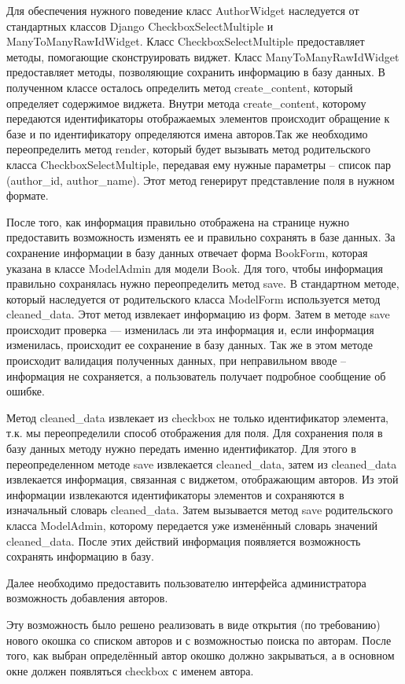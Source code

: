 \documentclass[a4paper]{report}
\begin{document}
Для обеспечения нужного поведение класс AuthorWidget наследуется от стандартных классов Django CheckboxSelectMultiple и ManyToManyRawIdWidget. Класс CheckboxSelectMultiple предоставляет методы, помогающие сконструировать виджет. Класс ManyToManyRawIdWidget предоставляет методы, позволяющие сохранить информацию в базу данных. В полученном классе осталось определить метод create\_content, который определяет содержимое виджета. Внутри метода create\_content, которому передаются идентификаторы отображаемых элементов происходит обращение к базе и по идентификатору определяются имена авторов.Так же необходимо переопределить метод render, который будет вызывать метод родительского класса CheckboxSelectMultiple, передавая ему нужные параметры -- список пар (author\_id, author\_name). Этот метод генерирут представление поля в нужном формате.

После того, как информация правильно отображена на странице нужно предоставить возможность изменять ее и правильно сохранять в базе данных. За сохранение  информации в базу данных отвечает форма BookForm, которая указана в классе ModelAdmin для модели Book. Для того, чтобы информация правильно сохранялась нужно переопределить метод save. В стандартном методе, который наследуется от родительского класса ModelForm используется метод cleaned\_data. Этот метод извлекает информацию из форм. Затем в методе save происходит проверка --- изменилась ли эта информация и, если информация изменилась, происходит ее сохранение в базу данных. Так же в этом методе происходит валидация полученных данных, при неправильном вводе -- информация не сохраняется, а пользователь получает подробное сообщение об ошибке. 

Метод cleaned\_data извлекает из checkbox не только идентификатор элемента, т.к. мы переопределили способ отображения для поля. Для сохранения поля в базу данных методу нужно передать именно идентификатор. Для этого в переопределенном методе save извлекается cleaned\_data, затем из cleaned\_data извлекается информация, связанная с виджетом, отображающим авторов. Из этой информации извлекаются идентификаторы элементов и сохраняются в изначальный словарь cleaned\_data. Затем вызывается метод save родительского класса ModelAdmin, которому передается уже изменённый словарь значений cleaned\_data. После этих действий информация появляется возможность сохранять информацию в базу.

Далее необходимо предоставить пользователю интерфейса администратора возможность добавления авторов. 

Эту возможность было решено реализовать в виде открытия (по требованию) нового окошка со списком авторов и с возможностью поиска по авторам. После того, как выбран определённый автор окошко должно закрываться, а в основном окне должен появляться checkbox с именем автора. 
\end{document}
